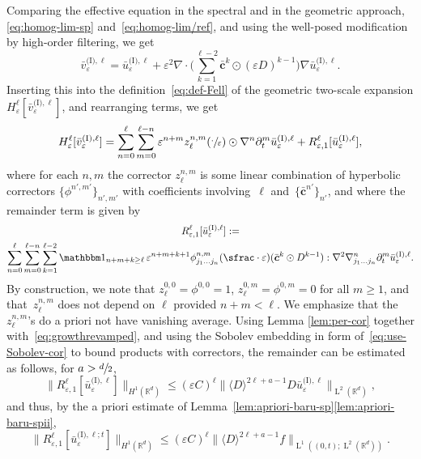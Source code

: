 \documentclass[JEP,XML,SOM,Unicode,published]{cedram}
\let\mathds\mathbbm
\theoremstyle{plain}
\theoremstyle{definition}
\numberwithin{equation}{section}
\newcommand{\e}{\varepsilon}
\newcommand{\R}{\mathbb R}
\newcommand{\cc}{{\boldsymbol c}}
\newcommand{\Ld}{\operatorname{L}}
\begin{document}
Comparing the effective equation in the spectral and in the geometric approach, \cf \eqref{eq:homog-lim-sp} and~\eqref{eq:homog-lim/ref}, and using the well-posed modification by high-order filtering, we get\vspace*{-3pt}
\begin{equation}\label{eq:u_and_v}
\bar v_\e^{\text{(I)},\ell}=\bar u_\e^{\text{(I)},\ell}+\e^2\nabla\cdot\Big(\sum_{k=1}^{\ell-2}\bar\cc^k\odot(\e D)^{k-1}\Big)\nabla \bar u_\e^{\text{(I)},\ell}.
\end{equation}
Inserting this into the definition~\eqref{eq:def-Fell} of the geometric two-scale expansion $H_{\e}^{\ell}[\bar v_{\e}^{\text{(I)},\ell}]$, and rearranging terms, we get\vspace*{-3pt}
\begin{equation}\label{eq:decomp-Fell-Rell}
H^\ell_\e[\bar v_\e^{\text{(I)},\ell}]=\sum_{n=0}^\ell\sum_{m=0}^{\ell-n}\e^{n+m}z^{n,m}_\ell(\sfrac{\cdot}{\e})\odot\nabla^n\partial_t^{m}\bar u_\e^{\text{(I)},\ell}+ R^{\ell}_{\e,1}[\bar u_{\e}^{\text{(I)},\ell}],
\end{equation}
{where for each $n,m$ the corrector $z^{n,m}_\ell$ is some linear combination of hyperbolic correctors $\{\phi^{n',m'}\}_{n',m'}$ with coefficients involving~$\ell$ and~$\{\bar\cc^{n'}\}_{n'}$,} and where the remainder term is given by
\begin{multline*}
R^{\ell}_{\e,1}[\bar u_{\e}^{\text{(I)},\ell}]:=\\
\sum_{n=0}^\ell\sum_{m=0}^{\ell-n}\sum_{k=1}^{\ell-2}\mathds1_{n+m+k\ge\ell}\,\e^{n+m+k+1} \phi^{n,m}_{j_1\ldots j_n}(\sfrac\cdot\e)(\bar\cc^k\odot D^{k-1}):\nabla^2\nabla_{j_1\ldots j_n}^n\partial_t^{m}\bar u_\e^{\text{(I)},\ell}.
\end{multline*}
By construction, we note that $z^{0,0}_\ell=\phi^{0,0}=1$, $z^{0,m}_\ell=\phi^{0,m}=0$ for all $m\ge1$, and that~$z^{n,m}_\ell$ does not depend on $\ell$ provided $n+m<\ell$. We emphasize that the $z^{n,m}_\ell$'s do a priori not have vanishing average.
Using Lemma \ref{lem:per-cor} together with~\eqref{eq:growthrevamped}, and using the Sobolev embedding in form of~\eqref{eq:use-Sobolev-cor} to bound products with correctors, the remainder can be estimated as follows, for $a>\sfrac d2$,
\begin{equation*}
\|R^{\ell}_{\e,1}[\bar u_{\e}^{\text{(I)},\ell}]\|_{H^1(\R^d)}\le (\e C)^{\ell}\|\langle D\rangle^{2\ell+a-1}D\bar u_{\e}^{\text{(I)},\ell}\|_{\Ld^2(\R^d)},
\end{equation*}
and thus, by the a priori estimate of Lemma~\ref{lem:apriori-baru-sp}\eqref{lem:apriori-baru-spii},
\begin{equation}\label{eq:final_bound_error1}
\|R^{\ell}_{\e,1}[\bar u_{\e}^{\text{(I)},\ell;t}]\|_{H^1(\R^d)}\leq (\e C)^{\ell}\|\langle D\rangle^{2\ell+a-{1}}f\|_{\Ld^1((0,t);\Ld^2(\R^d))}.
\end{equation}
\end{document}
